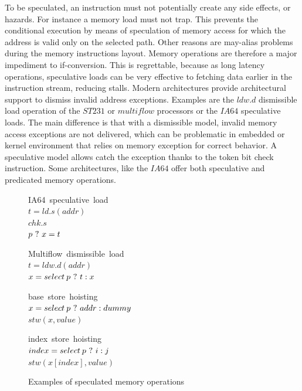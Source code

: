 To be speculated, an instruction must not potentially create any side effects, or hazards. For instance a memory load must not trap. This prevents the conditional execution by means of speculation of memory access for which the address is valid only on the selected path. Other reasons are may-alias problems during the memory instructions layout. Memory operations are therefore a major impediment to if-conversion. This is regrettable, because as long latency operations, speculative loads can be very effective to fetching data earlier in the instruction stream, reducing stalls. Modern architectures provide architectural support to dismiss invalid address exceptions. Examples are the $ldw.d$ dismissible load operation of the $ST231$ or $multiflow$ processors or the $IA64$ speculative loads. The main difference is that with a dismissible model, invalid memory access exceptions are not delivered, which can be problematic in embedded or kernel environment that relies on memory exception for correct behavior. A speculative model allows catch the exception thanks to the token bit check instruction. Some architectures, like the $IA64$ offer both speculative and predicated memory operations.

\begin{figure}
\begin{minipage}[t]{4cm}
\mbox{IA64 speculative load} \\
$t = ld.s(addr) $ \\
$chk.s $\\
$p ~?~ x = t$ \\
\end{minipage}
\begin{minipage}[t]{4cm}
\mbox{Multiflow dismissible load} \\
$t = ldw.d(addr) $ \\
$x = select\:p ~?~ t : x $ \\
\end{minipage}
\begin{minipage}[t]{4cm}
\mbox{base store hoisting} \\
$x=select\:p ~?~ addr : dummy $ \\
$stw (x, value) $ \\
\end{minipage}
\begin{minipage}[t]{4cm}
\mbox{index store hoisting} \\
$index=select\:p ~?~ i : j $ \\
$stw (x[index], value) $ \\
\end{minipage}
\caption{Examples of speculated memory operations}
\label{fig:spec}
\end{figure}

